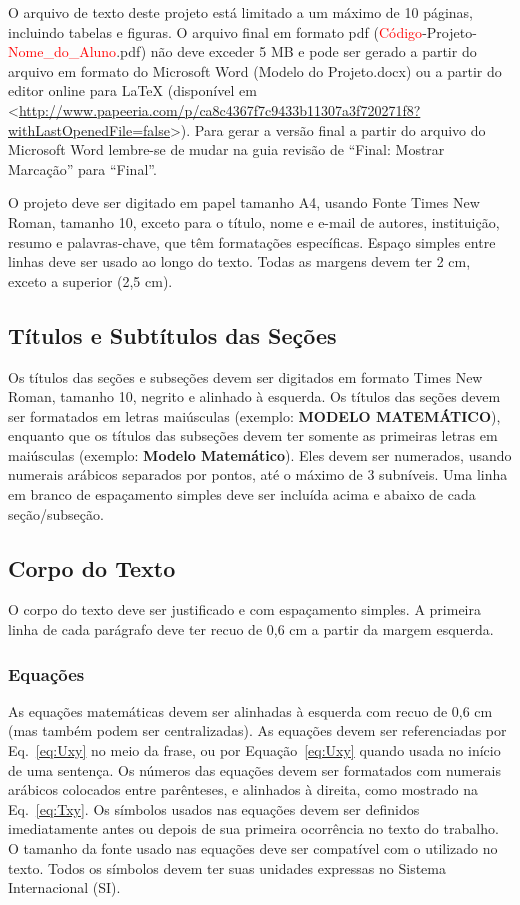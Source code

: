 \documentclass[%
  article,%
  10pt,%
  a4paper,%
  fleqn,%
  oneside,%
  sumario = tradicional,%
  chapter = TITLE,%
  section = TITLE,%
]{abntex2}
\begin{document}
O arquivo de texto deste projeto está limitado a um máximo de 10 páginas, incluindo tabelas e figuras. O arquivo final em formato pdf (\textcolor{red}{Código}-Projeto-\textcolor{red}{Nome\_do\_Aluno}.pdf) não deve exceder 5 MB e pode ser gerado a partir do arquivo em formato do Microsoft Word (Modelo do Projeto.docx) ou a partir do editor online para LaTeX (disponível em <\url{http://www.papeeria.com/p/ca8c4367f7c9433b11307a3f720271f8?withLastOpenedFile=false}>). Para gerar a versão final a partir do arquivo do Microsoft Word lembre-se de mudar na guia revisão de ``Final: Mostrar Marcação'' para ``Final''.

O projeto deve ser digitado em papel tamanho A4, usando Fonte Times New Roman, tamanho 10, exceto para o título, nome e e-mail de autores, instituição, resumo e palavras-chave, que têm formatações específicas. Espaço simples entre linhas deve ser usado ao longo do texto. Todas as margens devem ter 2 cm, exceto a superior (2,5 cm).

\subsection{Títulos e Subtítulos das Seções}\label{ssec:tit}

Os títulos das seções e subseções devem ser digitados em formato Times New Roman, tamanho 10, negrito e alinhado à esquerda. Os títulos das seções devem ser formatados em letras maiúsculas (exemplo: \textbf{MODELO MATEMÁTICO}), enquanto que os títulos das subseções devem ter somente as primeiras letras em maiúsculas (exemplo: \textbf{Modelo Matemático}). Eles devem ser numerados, usando numerais arábicos separados por pontos, até o máximo de 3 subníveis. Uma linha em branco de espaçamento simples deve ser incluída acima e abaixo de cada seção/subseção.

\subsection{Corpo do Texto}\label{ssec:corpo}

O corpo do texto deve ser justificado e com espaçamento simples. A primeira linha de cada parágrafo deve ter recuo de 0,6 cm a partir da margem esquerda.

\subsubsection{Equações}\label{sssec:eqs}

As equações matemáticas devem ser alinhadas à esquerda com recuo de 0,6 cm (mas também podem ser centralizadas). As equações devem ser referenciadas por Eq.~\eqref{eq:Uxy} no meio da frase, ou por Equação~\eqref{eq:Uxy} quando usada no início de uma sentença. Os números das equações devem ser formatados com numerais arábicos colocados entre parênteses, e alinhados à direita, como mostrado na Eq.~\eqref{eq:Txy}. Os símbolos usados nas equações devem ser definidos imediatamente antes ou depois de sua primeira ocorrência no texto do trabalho. O tamanho da fonte usado nas equações deve ser compatível com o utilizado no texto. Todos os símbolos devem ter suas unidades expressas no Sistema Internacional (SI).
\end{document}
